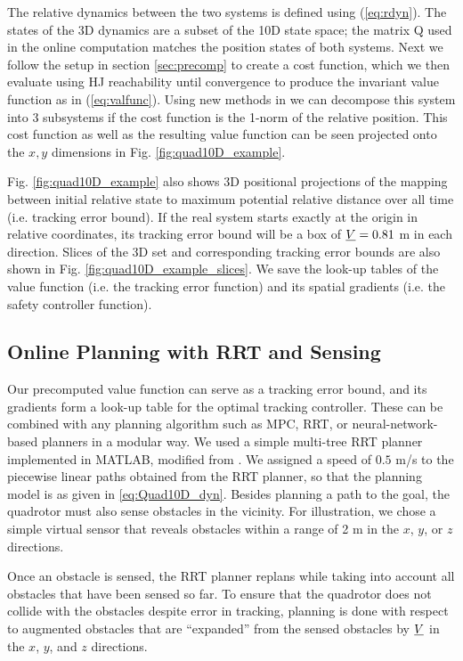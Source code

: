 The relative dynamics between the two systems is defined using (\ref{eq:rdyn}). The states of the 3D dynamics are a subset of the 10D state space; the matrix Q used in the online computation matches the position states of both systems. Next we follow the setup in section \ref{sec:precomp} to create a cost function, which we then evaluate using HJ reachability until convergence to produce the invariant value function as in (\ref{eq:valfunc}). Using new methods in \cite{Chen2016DecouplingExact, Chen2016DecouplingJournal} we can decompose this system into 3 subsystems if the cost function is the 1-norm of the relative position. This cost function as well as the resulting value function can be seen projected onto the $x,y$ dimensions in Fig. \ref{fig:quad10D_example}.

Fig. \ref{fig:quad10D_example} also shows 3D positional projections of the mapping between initial relative state to maximum potential relative distance over all time (i.e. tracking error bound). If the real system starts exactly at the origin in relative coordinates, its tracking error bound will be a box of $\underline{V} = 0.81$ m in each direction. Slices of the 3D set and corresponding tracking error bounds are also shown in Fig. \ref{fig:quad10D_example_slices}. We save the look-up tables of the value function (i.e. the tracking error function) and its spatial gradients (i.e. the safety controller function).

\subsection{Online Planning with RRT and Sensing}
Our precomputed value function can serve as a tracking error bound, and its gradients form a look-up table for the optimal tracking controller. These can be combined with any planning algorithm such as MPC, RRT, or neural-network-based planners in a modular way. We used a simple multi-tree RRT planner implemented in MATLAB, modified from \cite{Gavin2013}. We assigned a speed of $0.5$ m/s to the piecewise linear paths obtained from the RRT planner, so that the planning model is as given in \eqref{eq:Quad10D_dyn}. Besides planning a path to the goal, the quadrotor must also sense obstacles in the vicinity. For illustration, we chose a simple virtual sensor that reveals obstacles within a range of 2 m in the $x$, $y$, or $z$ directions.

Once an obstacle is sensed, the RRT planner replans while taking into account all obstacles that have been sensed so far. To ensure that the quadrotor does not collide with the obstacles despite error in tracking, planning is done with respect to augmented obstacles that are ``expanded'' from the sensed obstacles by $\underline{V}$ in the $x$, $y$, and $z$ directions.

